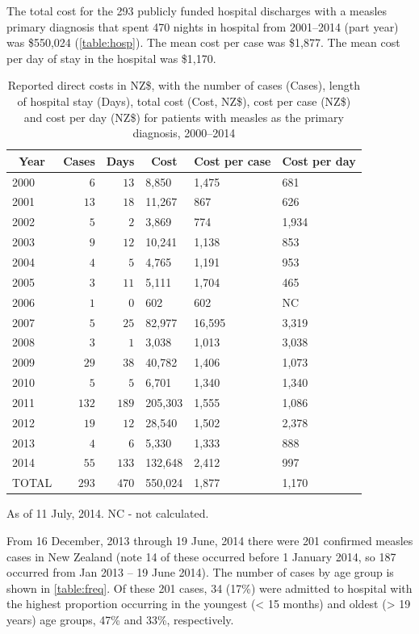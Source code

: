 \documentclass{article}
\begin{document}
The total cost for the 293 publicly funded hospital discharges with a measles primary diagnosis that spent 470 nights in hospital from 2001--2014 (part year) was \$550,024 (\autoref{table:hosp}). The mean cost per case was \$1,877. The mean cost per day of stay in the hospital was \$1,170.

\begin{table}
\begin{center}
\begin{tabular}{lrrlll}
\hline\hline
\multicolumn{1}{c}{Year}&\multicolumn{1}{c}{Cases}&\multicolumn{1}{c}{Days}&\multicolumn{1}{c}{Cost}&\multicolumn{1}{c}{Cost per case}&\multicolumn{1}{c}{Cost per day}\tabularnewline
\hline
2000&$  6$&$ 13$&8,850&1,475&681\tabularnewline
2001&$ 13$&$ 18$&11,267&867&626\tabularnewline
2002&$  5$&$  2$&3,869&774&1,934\tabularnewline
2003&$  9$&$ 12$&10,241&1,138&853\tabularnewline
2004&$  4$&$  5$&4,765&1,191&953\tabularnewline
2005&$  3$&$ 11$&5,111&1,704&465\tabularnewline
2006&$  1$&$  0$&602&602&NC\tabularnewline
2007&$  5$&$ 25$&82,977&16,595&3,319\tabularnewline
2008&$  3$&$  1$&3,038&1,013&3,038\tabularnewline
2009&$ 29$&$ 38$&40,782&1,406&1,073\tabularnewline
2010&$  5$&$  5$&6,701&1,340&1,340\tabularnewline
2011&$132$&$189$&205,303&1,555&1,086\tabularnewline
2012&$ 19$&$ 12$&28,540&1,502&2,378\tabularnewline
2013&$  4$&$  6$&5,330&1,333&888\tabularnewline
2014&$ 55$&$133$&132,648&2,412&997\tabularnewline
TOTAL&$293$&$470$&550,024&1,877&1,170\tabularnewline
\hline
\end{tabular}\end{center}\caption{Reported direct costs in NZ\$, with the number of cases (Cases), length of hospital stay (Days), total cost (Cost, NZ\$), cost per case (NZ\$) and cost per day (NZ\$) for patients with measles as the primary diagnosis, 2000--2014}
\label{table:hosp}
 \centering
 \begin{tablenotes}
      \small
      \item As of 11 July, 2014. NC - not calculated.
    \end{tablenotes}
\end{table}

From 16 December, 2013 through 19 June, 2014 there were 201 confirmed measles cases in New Zealand (note 14 of these occurred before 1 January 2014, so 187 occurred from Jan 2013 -- 19 June 2014). The number of cases by age group is shown in \autoref{table:freq}. Of these 201 cases, 34 (17\%) were admitted to hospital with the highest proportion occurring in the youngest (< 15 months) and oldest (> 19 years) age groups, 47\% and 33\%, respectively.
\end{document}
